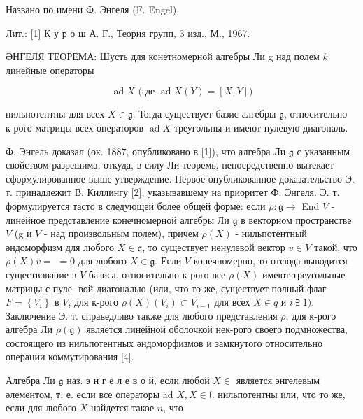 \documentclass[10pt]{article}
\begin{document}
Названо по имени Ф. Энгеля (F. Engel).



Лит.: [1] К у р о ш А. Г., Теория групп, 3 изд., М., 1967.



ӘНГЕЛЯ ТЕОРЕМА: Шусть для конетномерной алгебры Ли g над полем $k$ линейные операторы



\[

\operatorname{ad} X \text { (где } \operatorname{ad} X(Y)=[X, Y])

\]



нильпотентны для всех $X \in \mathfrak{g}$. Тогда существует базис алгебры $\mathfrak{g}$, относительно к-рого матрицы всех операторов $\operatorname{ad} X$ треугольны и имеют нулевую диагональ.



Ф. Энгель доказал (ок. 1887, опубликовано в [1]), что алгебра Ли $\mathfrak{g}$ с указанным свойством разрешима, откуда, в силу Ли теоремь, непосредственно вытекает сформулированное выше утверждение. Первое опубликованное доказательство Э. т. принадлежит В. Киллингу [2], указывавшему на приоритет Ф. Энгеля. Э. т. формулируется тасто в следующей более общей форме: если $\rho: \mathfrak{g} \rightarrow$ End $V$ - линейное представление конечномерной алгебры Ли $\mathfrak{g}$ в векторном пространстве $V$ (g и $V$ - над произвольным полем), причем $\rho(X)$ - нильпотентный әндоморфизм для любого $X \in \mathfrak{q}$, то существует ненулевой вектор $v \in V$ такой, что $\rho(X) v=$ $=0$ для любого $X \in \mathfrak{g}$. Если $V$ конечномерно, то отсюда выводится существование в $V$ базиса, относительно к-рого все $\rho(X)$ имеют треугольные матрицы с пуле- вой диагональю (или, что то же, существует полный флаг $F=\left\{V_{i}\right\}$ в $V$, для к-рого $\rho(X)\left(V_{i}\right) \subset V_{i-1}$ для всех $X \in q$ и $i \supseteqq 1)$. Заключение Э. т. справедливо также для любого представления $\rho$, для к-рого алгебра Ли $\rho(\mathfrak{g})$ является линейной оболочкой нек-рого своего подмножества, состоящего из нильпотентных әндоморфизмов и замкнутого относительно операции коммутирования [4].



Алгебра Ли $\mathfrak{g}$ наз. э н г е л е в о й, если любой $X \in$ является энгелевым әлементом, т. е. если все операторы ad $X, X \in \mathfrak{l}$. нильпотентны или, что то же, если для любого $X$ найдется такое $n$, что
\end{document}
